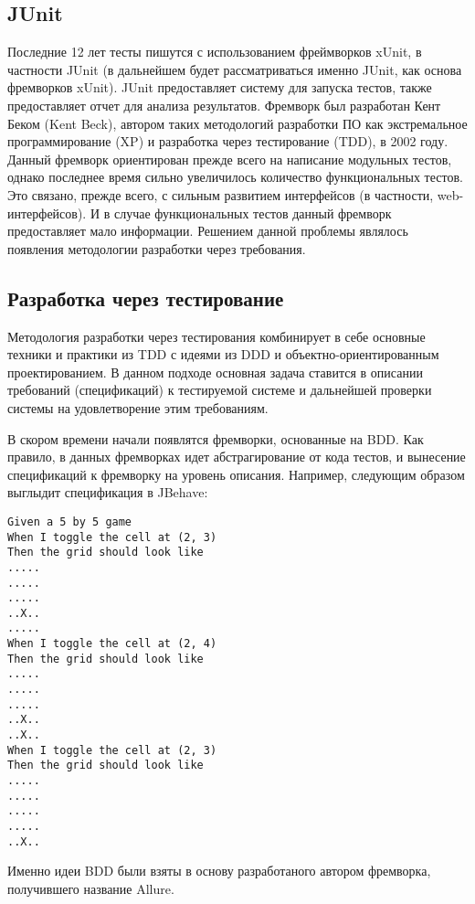 \subsection{JUnit}

Последние 12 лет тесты пишутся с использованием фреймворков xUnit, в частности JUnit (в дальнейшем будет рассматриваться именно JUnit, как основа фремворков xUnit). JUnit предоставляет систему для запуска тестов, также предоставляет отчет для анализа результатов. 
Фремворк был разработан Кент Беком (Kent Beck), автором таких методологий разработки ПО как экстремальное программирование (XP) и разработка через тестирование (TDD), в 2002 году. 
Данный фремворк ориентирован прежде всего на написание модульных тестов, однако последнее время сильно увеличилось количество функциональных тестов. Это связано, прежде всего, с сильным развитием интерфейсов (в частности, web-интерфейсов). И в случае функциональных тестов данный фремворк предоставляет мало информации. Решением данной проблемы являлось появления методологии разработки через требования.

\subsection{Разработка через тестирование}

Методология разработки через тестирования комбинирует в себе основные техники и практики из TDD с идеями из DDD и объектно-ориентированным проектированием. В данном подходе основная задача ставится в описании требований (спецификаций) к тестируемой системе и дальнейшей проверки системы на удовлетворение этим требованиям. 

В скором времени начали появлятся фремворки, основанные на BDD. Как правило, в данных фремворках идет абстрагирование от кода тестов, и вынесение спецификаций к фремворку на уровень описания. Например, следующим образом выглыдит спецификация в JBehave:

\begin{lstlisting}
Given a 5 by 5 game
When I toggle the cell at (2, 3)
Then the grid should look like
.....
.....
.....
..X..
.....
When I toggle the cell at (2, 4)
Then the grid should look like
.....
.....
.....
..X..
..X..
When I toggle the cell at (2, 3)
Then the grid should look like
.....
.....
.....
.....
..X..
\end{lstlisting}

Именно идеи BDD были взяты в основу разработаного автором фремворка, получившего название Allure.


